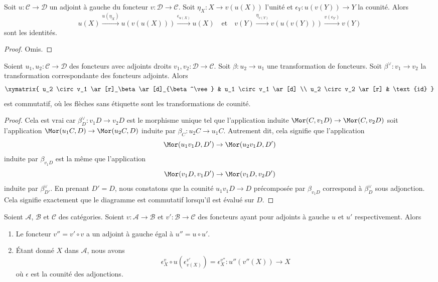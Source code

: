 \begin{lemma}
\label{lemma-unit-counit-relations}
Soit $u : \mathcal{C} \to \mathcal{D}$ un adjoint à gauche du foncteur $v : \mathcal{D} \to \mathcal{C}$. Soit $\eta_X : X \to v(u(X))$ l'unité et
$\epsilon_Y : u(v(Y)) \to Y$ la counité. Alors
$$
u(X) \xrightarrow{u(\eta_X)} u(v(u(X)))
\xrightarrow{\epsilon_{u(X)}} u(X)
\quad\text{et}\quad
v(Y) \xrightarrow{\eta_{v(Y)}} v(u(v(Y))) \xrightarrow{v(\epsilon_Y)}
v(Y)
$$
sont les identités.
\end{lemma}

\begin{proof}
Omis.
\end{proof}



\begin{lemma}
\label{lemma-transformation-between-functors-and-adjoints}
Soient $u_1, u_2 : \mathcal{C} \to \mathcal{D}$ des foncteurs avec adjoints
droits $v_1, v_2 : \mathcal{D} \to \mathcal{C}$. Soit $\beta : u_2 \to u_1$
une transformation de foncteurs. Soit $\beta^\vee : v_1 \to v_2$ la
transformation correspondante des foncteurs adjoints. Alors
$$
\xymatrix{
u_2 \circ v_1 \ar[r]_\beta \ar[d]_{\beta^\vee} &
u_1 \circ v_1 \ar[d] \\
u_2 \circ v_2 \ar[r] & \text{id}
}
$$
est commutatif, où les flèches sans étiquette sont les transformations de
counité.
\end{lemma}

\begin{proof}
Cela est vrai car $\beta^\vee_D : v_1D \to v_2D$ est le morphisme unique tel
que l'application induite $\Mor(C, v_1D) \to \Mor(C, v_2D)$ soit
l'application $\Mor(u_1C, D) \to \Mor(u_2C, D)$ induite par $\beta_C : u_2C \to u_1C$. Autrement dit, cela signifie que l'application
$$
\Mor(u_1 v_1 D, D') \to \Mor(u_2 v_1 D, D')
$$
induite par $\beta_{v_1 D}$ est la même que l'application
$$
\Mor(v_1 D, v_1 D') \to \Mor(v_1 D, v_2 D')
$$
induite par $\beta^\vee_{D'}$. En prenant $D' = D$, nous constatons que la counité
$u_1 v_1 D \to D$ précomposée par $\beta_{v_1D}$ correspond à $\beta^\vee_D$
sous adjonction. Cela signifie exactement que le diagramme est commutatif
lorsqu'il est évalué sur $D$.
\end{proof}

\begin{lemma}
\label{lemma-compose-counits}
Soient $\mathcal{A}$, $\mathcal{B}$ et $\mathcal{C}$ des catégories. Soient $v : \mathcal{A} \to \mathcal{B}$ et $v' : \mathcal{B} \to \mathcal{C}$ des
foncteurs ayant pour adjoints à gauche $u$ et $u'$ respectivement. Alors
\begin{enumerate}
\item Le foncteur $v'' = v' \circ v$ a un adjoint à gauche égal à $u'' = u \circ u'$.
\item Étant donné $X$ dans $\mathcal{A}$, nous avons
\begin{equation}
\label{equation-compose-counits}
\epsilon_X^v \circ u(\epsilon^{v'}_{v(X)}) = \epsilon^{v''}_X :
u''(v''(X)) \to X
\end{equation}
où $\epsilon$ est la counité des adjonctions.
\end{enumerate}
\end{lemma}

